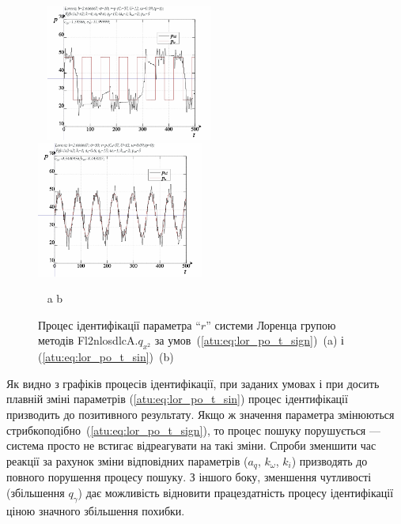 \begin{figure}[ht!]
  \begin{center}
    ~ \hfill
    \includegraphics[width=0.49\textwidth]{p/cha/lor/Fl2nlosdlcA/Fl2nlosdlcA-p_xz_1_wp009.png}
    \hfill
    \includegraphics[width=0.49\textwidth]{p/cha/lor/Fl2nlosdlcA/Fl2nlosdlcA-p_xz_0_wp009.png}
    \hfill ~
  \end{center}
  \vspace{-1.0ex}
  \begin{center}
    ~ \hfill a \hfill\hfill b \hfill ~
  \end{center}
  \vspace{-1.5ex}
  \caption{Процес ідентифікації параметра ``$r$'' системи Лоренца групою методів Fl2nlosdlcA.$q_{x^2} $ за умов~(\ref{atu:eq:lor_po_t_sign})~(a) і (\ref{atu:eq:lor_po_t_sin})~(b)}
\label{atu:f:lor_id_Fl2nlosdlcA_wp009}
\end{figure}

Як видно з графіків процесів ідентифікації, при заданих умовах
і при досить плавній зміні параметрів (\ref{atu:eq:lor_po_t_sin}) процес
ідентифікації призводить до позитивного результату. Якщо ж
значення параметра змінюються стрибкоподібно~(\ref{atu:eq:lor_po_t_sign}),
то процес пошуку порушується --- система просто не встигає
відреагувати на такі зміни. Спроби зменшити час реакції за
рахунок зміни відповідних параметрів
($a_q$, $k_\omega$, $k_i$)
призводять до повного порушення процесу пошуку. З іншого
боку, зменшення чутливості (збільшення $q_\gamma$) дає можливість відновити працездатність процесу
ідентифікації ціною значного збільшення похибки.

